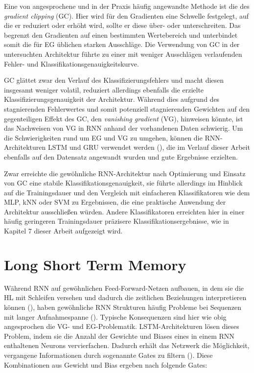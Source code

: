 Eine von \cite{pascanu2013difficulty} angesprochene und in der Praxis häufig angewandte Methode ist die des \textit{gradient clipping} (GC). Hier wird für den Gradienten eine Schwelle festgelegt, auf die er reduziert oder erhöht wird, sollte er diese über- oder unterschreiten. Das begrenzt den Gradienten auf einen bestimmten Wertebereich und unterbindet somit die für EG üblichen starken Ausschläge. Die Verwendung von GC in der untersuchten Architektur führte zu einer mit weniger Ausschlägen verlaufenden Fehler- und Klassifikationsgenauigkeitskurve.

GC glättet zwar den Verlauf des Klassifizierungsfehlers und macht diesen insgesamt weniger volatil, reduziert allerdings ebenfalls die erzielte Klassifizierungsgenauigkeit der Architektur. Während dies aufgrund des stagnierenden Fehlerwertes und somit potenziell stagnierenden Gewichten auf den gegenteiligen Effekt des GC, den \textit{vanishing gradient} (VG), hinweisen könnte, ist das Nachweisen von VG in RNN anhand der vorhandenen Daten schwierig. Um die Schwierigkeiten rund um EG und VG zu umgehen, können die RNN-Architekturen LSTM und GRU verwendet werden (\cite{simao2019emg}), die im Verlauf dieser Arbeit ebenfalls auf den Datensatz angewandt wurden und gute Ergebnisse erzielten.

Zwar erreichte die gewöhnliche RNN-Architektur nach Optimierung und Einsatz von GC eine stabile Klassifikationsgenauigkeit, sie führte allerdings im Hinblick auf die Trainingsdauer und den Vergleich mit einfacheren Klassifikatoren wie dem MLP, kNN oder SVM zu Ergebnissen, die eine praktische Anwendung der Architektur ausschließen würden. Andere Klassifikatoren erreichten hier in einer häufig geringeren Trainingsdauer präzisere Klassifikationsergebnisse, wie in Kapitel 7 dieser Arbeit aufgezeigt wird.


\section{Long Short Term Memory}
\label{sec:lstm}

Während RNN auf gewöhnlichen Feed-Forward-Netzen aufbauen, in dem sie die HL mit Schleifen versehen und dadurch die zeitlichen Beziehungen interpretieren können (\cite{simao2019emg}), haben gewöhnliche RNN Strukturen häufig Probleme bei Sequenzen mit langer Aufnahmespanne (\cite{pascanu2013difficulty}). Typische Konsequenzen sind hier wie obig angesprochen die VG- und EG-Problematik. LSTM-Architekturen lösen dieses Problem, indem sie die Anzahl der Gewichte und Biases eines in einem RNN enthaltenen Neurons vervierfachen. Dadurch erhält das Netzwerk die Möglichkeit, vergangene Informationen durch sogenannte Gates zu filtern (\cite{simao2019emg}). Diese Kombinationen aus Gewicht und Bias ergeben nach \cite{simao2019emg} folgende Gates:


